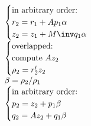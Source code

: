 \documentclass[11pt]{artikel3}
\begin{document}
\begin{Outline}
\[\begin{array}{l}
\begin{cases}
    \hbox{in arbitrary order:}\\    
    r_2 = r_1 + Ap_1\alpha\\
    z_2 = z_1 + M\inv q_1\alpha\\  
  \end{cases}\\
  \begin{cases}
    \hbox{overlapped:}\\
    \hbox{compute $Az_2$} \\ \rho_2 = r_2^tz_2\\
  \end{cases}\\  
  \beta=\rho_2/\rho_1 \\
  \begin{cases}
    \hbox{in arbitrary order:}\\    
    p_2 = z_2 + p_1\beta\\
    q_2 = Az_2 + q_1\beta\\
  \end{cases}\\  
\end{array}
\]


\end{Outline}
\end{document}
